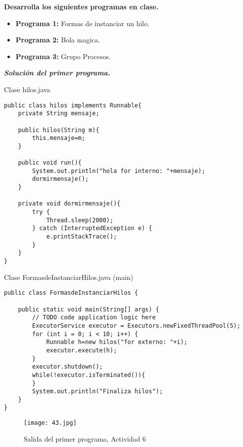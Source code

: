 \textbf{Desarrolla los siguientes programas en clase.}\vspace{.2mm}

\begin{itemize}
\item \textbf{Programa 1:} Formas de instanciar un hilo.
\item \textbf{Programa 2:} Bola magica.
\item \textbf{Programa 3:} Grupo Procesos.
\end{itemize}\vspace{.5cm}

\textbf{\textit{Solución del primer programa.}}

\begin{center}
Clase hilos.java
\end{center}

\begin{verbatim}
public class hilos implements Runnable{ 
    private String mensaje;
    
    public hilos(String m){
        this.mensaje=m;
    }

    public void run(){
        System.out.println("hola for interno: "+mensaje);
        dormirmensaje();
    }
    
    private void dormirmensaje(){
        try {
            Thread.sleep(2000);
        } catch (InterruptedException e) {
            e.printStackTrace();
        }
    }
}
\end{verbatim} \vspace{1cm}

\begin{center}
Clase FormasdeInstanciarHilos.java (main)
\end{center}

\begin{verbatim}
public class FormasdeInstanciarHilos {

    public static void main(String[] args) {
        // TODO code application logic here
        ExecutorService executor = Executors.newFixedThreadPool(5);
        for (int i = 0; i < 10; i++) {
            Runnable h=new hilos("for externo: "+i);
            executor.execute(h);
        }
        executor.shutdown();
        while(!executor.isTerminated()){
        }
        System.out.println("Finaliza hilos");
    }
}
\end{verbatim} \vspace{1cm}
\begin{figure}[h!]
		\centering
		{\texttt{[image: 43.jpg]}\par} 
		\caption{Salida del primer programa, Actividad 6}\vspace{1cm}
\end{figure}\newpage

